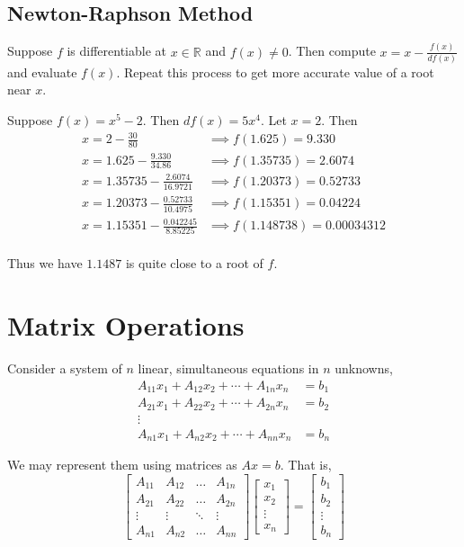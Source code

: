 \subsection{Newton-Raphson Method}
	Suppose $f$ is differentiable at $x \in \mathbb{R}$ and $f(x) \ne 0$.
	Then compute $x = x - \frac{f(x)}{df(x)}$ and evaluate $f(x)$.
	Repeat this process to get more accurate value of a root near $x$.

\begin{remark}
	Suppose $f(x) = x^5 - 2$.
	Then $df(x) = 5x^4$.
	Let $x = 2$.
	Then
	\begin{align*}
		x = 2 - \frac{30}{80} & \implies f(1.625) = 9.330 \\
		x = 1.625 - \frac{9.330}{34.86} & \implies f(1.35735) = 2.6074 \\
		x = 1.35735 - \frac{2.6074}{16.9721} & \implies f(1.20373) = 0.52733 \\
		x = 1.20373 - \frac{0.52733}{10.4975} & \implies f(1.15351) = 0.04224 \\
		x = 1.15351 - \frac{0.042245}{8.85225} & \implies f(1.148738) = 0.00034312 \\
	\end{align*}

	Thus we have $1.1487$ is quite close to a root of $f$.
\end{remark}

\section{Matrix Operations}

	Consider a system of $n$ linear, simultaneous equations in $n$ unknowns,
	\begin{align*}
		A_{11}x_1 + A_{12}x_2 + \dotsb + A_{1n}x_n & = b_1 \\
		A_{21}x_1 + A_{22}x_2 + \dotsb + A_{2n}x_n & = b_2 \\
		\vdots \\
		A_{n1}x_1 + A_{n2}x_2 + \dotsb + A_{nn}x_n & = b_n 
	\end{align*}

	We may represent them using matrices as $Ax = b$.
	That is,
	\[ \begin{bmatrix} A_{11} & A_{12} & \dots & A_{1n} \\ A_{21} & A_{22} & \dots & A_{2n} \\ \vdots & \vdots & \ddots & \vdots \\ A_{n1} & A_{n2} & \dots & A_{nn} \end{bmatrix} \begin{bmatrix} x_1 \\ x_2 \\ \vdots \\ x_n \end{bmatrix} = \begin{bmatrix} b_1 \\ b_2 \\ \vdots \\ b_n \end{bmatrix} \]
		

